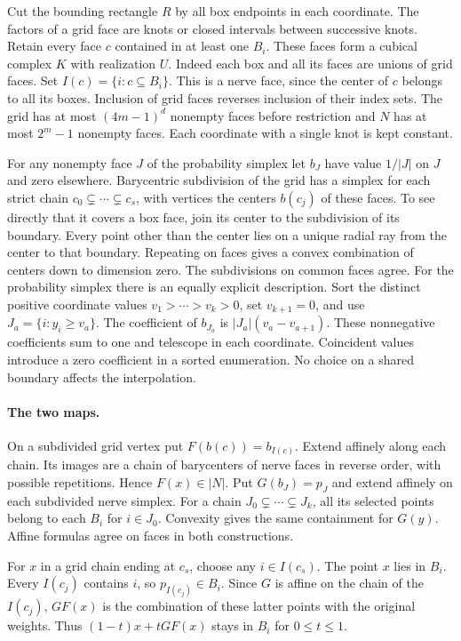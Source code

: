 Cut the bounding rectangle $R$ by all box endpoints in each coordinate.
The factors of a grid face are knots or closed intervals between successive
knots. Retain every face $c$ contained in at least one $B_i$. These faces
form a cubical complex $K$ with realization $U$. Indeed each box and all
its faces are unions of grid faces. Set $I(c)=\{i:c\subseteq B_i\}$.
This is a nerve face, since the center of $c$ belongs to all its boxes.
Inclusion of grid faces reverses inclusion of their index sets. The grid
has at most $(4m-1)^d$ nonempty faces before restriction and $N$ has at most
$2^m-1$ nonempty faces. Each coordinate with a single knot is kept constant.

For any nonempty face $J$ of the probability simplex let $b_J$ have value
$1/|J|$ on $J$ and zero elsewhere. Barycentric subdivision of the grid has
a simplex for each strict chain $c_0\subsetneq\cdots\subsetneq c_s$,
with vertices the centers $b(c_j)$ of these faces. To see directly that it
covers a box face, join its center to the subdivision of its boundary.
Every point other than the center lies on a unique radial ray from the
center to that boundary. Repeating on faces gives a convex combination of
centers down to dimension zero. The subdivisions on common faces agree.
For the probability simplex there is an equally explicit description.
Sort the distinct positive coordinate values $v_1>\cdots>v_k>0$, set
$v_{k+1}=0$, and use $J_a=\{i:y_i\geq v_a\}$.
The coefficient of $b_{J_a}$ is $|J_a|(v_a-v_{a+1})$. These nonnegative
coefficients sum to one and telescope in each coordinate.
Coincident values introduce a zero coefficient in a sorted enumeration.
No choice on a shared boundary affects the interpolation.

\paragraph{The two maps.}
On a subdivided grid vertex put $F(b(c))=b_{I(c)}$. Extend affinely along
each chain. Its images are a chain of barycenters of nerve faces in reverse
order, with possible repetitions. Hence $F(x)\in |N|$.
Put $G(b_J)=p_J$ and extend affinely on each subdivided nerve simplex.
For a chain $J_0\subsetneq\cdots\subsetneq J_k$, all its selected points
belong to each $B_i$ for $i\in J_0$. Convexity gives the same containment
for $G(y)$. Affine formulas agree on faces in both constructions.

For $x$ in a grid chain ending at $c_s$, choose any $i\in I(c_s)$.
The point $x$ lies in $B_i$. Every $I(c_j)$ contains $i$, so
$p_{I(c_j)}\in B_i$. Since $G$ is affine on the chain of the $I(c_j)$,
$GF(x)$ is the combination of these latter points with the original
weights. Thus $(1-t)x+tGF(x)$ stays in $B_i$ for $0\leq t\leq1$.

